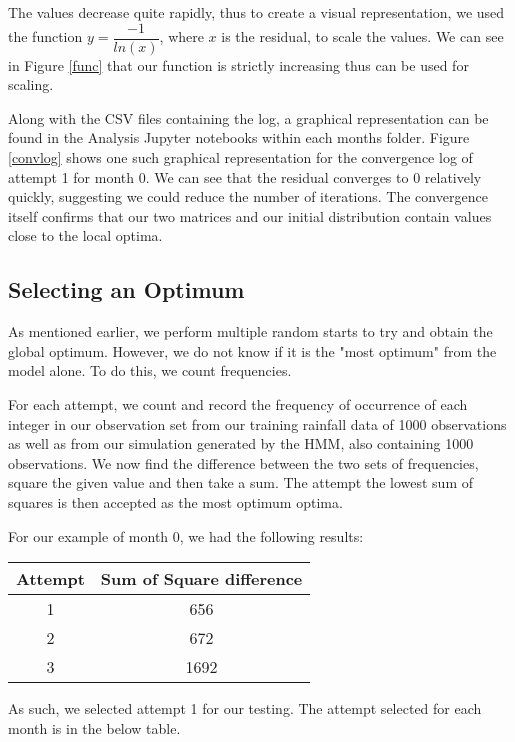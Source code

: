     The values decrease quite rapidly, thus to create a visual representation, we used the function $ y = \dfrac{-1}{ln(x)}$, where $x$ is the residual, to scale the values. We can see in Figure \ref{func} that our function is strictly increasing thus can be used for scaling. 

    Along with the CSV files containing the log, a graphical representation can be found in the Analysis Jupyter notebooks within each months folder. Figure \ref{convlog} shows one such graphical representation for the convergence log of attempt 1 for month 0. We can see that the residual converges to 0 relatively quickly, suggesting we could reduce the number of iterations. The convergence itself confirms that our two matrices and our initial distribution contain values close to the local optima. 

    \subsection{Selecting an Optimum}
    \label{Simple_Rainfall_HMM:Analysis:Selecting_an_Optimum}

    As mentioned earlier, we perform multiple random starts to try and obtain the global optimum. However, we do not know if it is the "most optimum" from the model alone. To do this, we count frequencies. 

    For each attempt, we count and record the frequency of occurrence of each integer in our observation set from our training rainfall data of 1000 observations as well as from our simulation generated by the HMM, also containing 1000 observations. We now find the difference between the two sets of frequencies, square the given value and then take a sum. The attempt the lowest sum of squares is then accepted as the most optimum optima. 

    For our example of month 0, we had the following results:
    \begin{center}
    \begin{tabular}{c | c}
        Attempt & Sum of Square difference \\
        \hline
        1 & 656 \\
        2 & 672 \\
        3 & 1692
    \end{tabular}
    \end{center}

    As such, we selected attempt 1 for our testing. The attempt selected for each month is in the below table.

